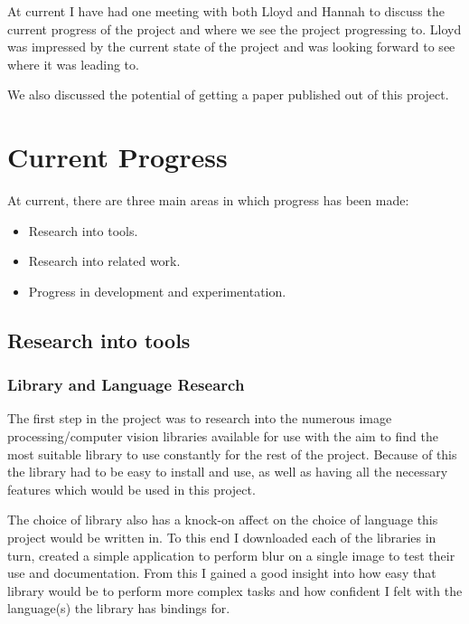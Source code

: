 \documentclass[11pt,fleqn,twoside]{article}
\begin{document}
At current I have had one meeting with both Lloyd and Hannah to discuss the current progress of 
the project and where we see the project progressing to. Lloyd was impressed by the current state
of the project and was looking forward to see where it was leading to.

We also discussed the potential of getting a paper published out of this project.

\clearpage
\section{Current Progress}

At current, there are three main areas in which progress has been made:

\begin{itemize}
\item Research into tools.
\item Research into related work.
\item Progress in development and experimentation.
\end{itemize}

\clearpage
\subsection{Research into tools}

\subsubsection{Library and Language Research}
The first step in the project was to research into the numerous image processing/computer vision
libraries available for use with the aim to find the most suitable library to use constantly for 
the rest of the project. Because of this the library had to be easy to install and use, as well as
having all the necessary features which would be used in this project.

The choice of library also has a knock-on affect on the choice of language this project would be 
written in. To this end I downloaded each of the libraries in turn, created a simple application to
 perform blur on a single image to test their use and documentation. From this I gained a good 
insight into how easy that library would be to perform more complex tasks and how confident I felt 
with the language(s) the library has bindings for.
\end{document}
